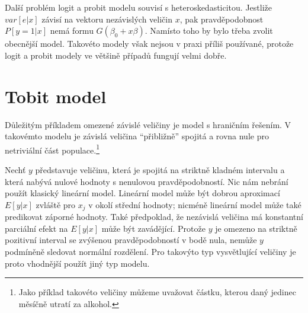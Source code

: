 Další problém logit a probit modelu souvisí s heteroskedasticitou. Jestliže $var[e|x]$ závisí na vektoru nezávislých veličin $x$, pak pravděpodobnost $P[y=1|x]$ nemá formu $G(\beta_0 + x \beta)$. Namísto toho by bylo třeba zvolit obecnější model. Takovéto modely však nejsou v praxi příliš používané, protože logit a probit modely ve většině případů fungují velmi dobře.

\section{Tobit model}

Důležitým příkladem omezené závislé veličiny je model s hraničním řešením. V takovémto modelu je závislá veličina ``přibližně'' spojitá a rovna nule pro netriviální část populace.\footnote{Jako příklad takovéto veličiny můžeme uvažovat částku, kterou daný jedinec měsíčně utratí za alkohol.}

Nechť $y$ představuje veličinu, která je spojitá na striktně kladném intervalu a která nabývá nulové hodnoty s nenulovou pravděpodobností. Nic nám nebrání použít klasický lineární model. Lineární model může být dobrou aproximací $E[y|x]$ zvláště pro $x_j$ v okolí střední hodnoty; nicméně lineární model může také predikovat záporné hodnoty. Také předpoklad, že nezávislá veličina má konstantní parciální efekt na $E[y|x]$ může být zavádějící. Protože $y$ je omezeno na striktně pozitivní interval se zvýšenou pravděpodobností v bodě nula, nemůže $y$ podmíněně sledovat normální rozdělení. Pro takovýto typ vysvětlující veličiny je proto vhodnější použít jiný typ modelu.


